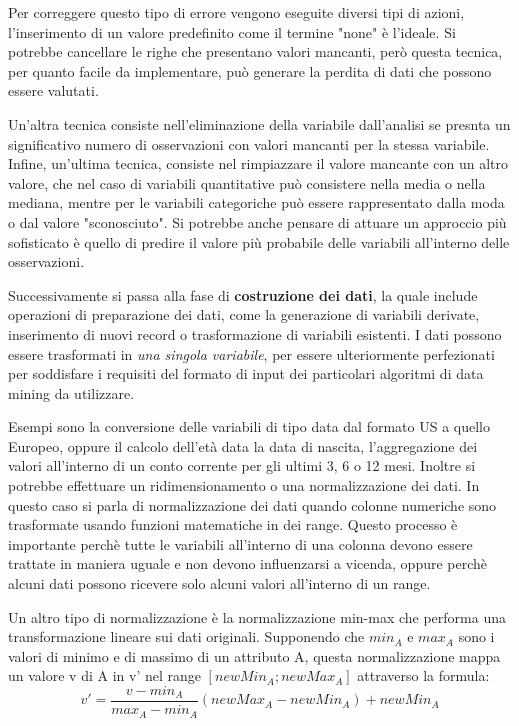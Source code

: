 \documentclass[a4paper]{extarticle}
\begin{document}
Per correggere questo tipo di errore vengono eseguite diversi tipi di azioni, l'inserimento di un valore predefinito come il termine "none" è l'ideale. Si potrebbe cancellare le righe che presentano valori mancanti, però questa tecnica, per quanto facile da implementare, può generare la perdita di dati che possono essere valutati. 

Un'altra tecnica consiste nell'eliminazione della variabile dall'analisi se presnta un significativo numero di osservazioni con valori mancanti per la stessa variabile. Infine, un'ultima tecnica, consiste nel rimpiazzare il valore mancante con un altro valore, che nel caso di variabili quantitative può consistere nella media o nella mediana, mentre per le variabili categoriche può essere rappresentato dalla moda o dal valore "sconosciuto". Si potrebbe anche pensare di attuare un approccio più sofisticato è quello di predire il valore più probabile delle variabili all'interno delle osservazioni.

Successivamente si passa alla fase di \textbf{costruzione dei dati}, la quale include operazioni di preparazione dei dati, come la generazione di variabili derivate, inserimento di nuovi record o trasformazione di variabili esistenti. I dati possono essere trasformati in \textit{una singola variabile}, per essere ulteriormente perfezionati per soddisfare i requisiti del formato di input dei particolari algoritmi di data mining da utilizzare.

Esempi sono la conversione delle variabili di tipo data dal formato US a quello Europeo, oppure il calcolo dell'età data la data di nascita, l'aggregazione dei valori all'interno di un conto corrente per gli ultimi 3, 6 o 12 mesi. Inoltre si potrebbe effettuare un ridimensionamento o una normalizzazione dei dati. In questo caso si parla di normalizzazione dei dati quando colonne numeriche sono trasformate usando funzioni matematiche in dei range. Questo processo è importante perchè tutte le variabili all'interno di una colonna devono essere trattate in maniera uguale e non devono influenzarsi a vicenda, oppure perchè alcuni dati possono ricevere solo alcuni valori all'interno di un range.

Un altro tipo di normalizzazione è la normalizzazione min-max che performa una transformazione lineare sui dati originali. Supponendo che $ min_A$ e $max_A$ sono i valori di minimo e di massimo di un attributo A, questa normalizzazione mappa un valore v di A in v' nel range $[newMin_A; newMax_A]$ attraverso la formula:
\begin{equation*}
v'= \dfrac{v-min_A}{max_A-min_A}(newMax_A - newMin_A)+newMin_A
\end{equation*}
\end{document}
